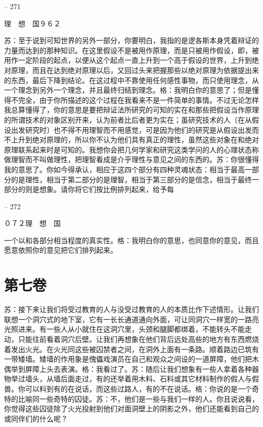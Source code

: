 \documentclass[11pt,oneside]{book}
\begin{document}
\begin{common-format}
    

-- 271

    理　想　国９６２

    苏：至于说到可知世界的另外一部分，你要明白，我指的是逻各斯本身凭着辩证的力量而达到的那种知识。在这里假设不是被用作原理，而是只被用作假设，即，被用作一定阶段的起点，以便从这个起点一直上升到一个高于假设的世界，上升到绝对原理，而且在达到绝对原理以后，又回过头来把握那些以绝对原理为依据提出来的东西，最后下降到结论。在这过程中不靠使用任何感性事物，而只使用理念，从一个理念到另外一个理念，并且最终归结到理念。格：我明白你的意思了；但是懂得不完全，由于你所描述的这个过程在我看来不是一件简单的事情。不过无论怎样我总算懂得了，你的意思是要把辩证法所研究的可知的实在和那些把假设当作原理的所谓技术的对象区别开来，认为前者比后者更为实在；虽研究技术的人〔在从假设出发研究时〕也不得不用理智而不用感觉，可是因为他们的研究是从假设出发而不上升到绝对原理的，所以你不认为他们具有真正的理性，虽然这些对象在和绝对原理联系起来时是可知的。我想你会把几何学家和研究这类学问的人的心理状态称做理智而不叫做理性，把理智看成是介乎理性与意见之间的东西的。苏：你很懂得我的意思了。你如今得承认，相应于这四个部分有四种灵魂状态：相当于最高一部分的是理性，相当于第二部分的是理智，相当于第三部分的是信念，相当于最终一部分的则是想象。请你将它们按比例排列起来，给予每

    

-- 272

    ０７２理　想　国

    一个以和各部分相当程度的真实性。格：我明白你的意思，也同意你的意见，而且愿意依照你的意见把它们排列起来。

    
\chapter{第七卷}
苏：接下来让我们将受过教育的人与没受过教育的人的本质比作下述情形。让我们联想一个洞穴式的地下室，它有一长长通道通向外面，可让同洞穴一样宽的一路亮光照进来。有一些人从小就住在这洞穴里，头颈和腿脚都绑着，不能转头不能走动，只能往前看着洞穴后壁。让我们再想象在他们背后远处高些的地方有东西燃烧着发出火光。在火光同这些被囚禁者之间，在洞外上面有一条路。顺着路边已筑有一带矮墙。矮墙的作用象是傀儡戏演员在自己和观众之间设的一道屏障，他们把木偶举到屏障上头去表演。格：我看过了。苏：随后让我们想象有一些人拿着各种器物举过墙头，从墙后面走过，有的还举着用木料、石料或其它材料制作的假人与假兽。你可以料到有的在说话，而这些过路人，有的不在说话。格：你说的是一个奇特的比喻同一些奇特的囚徒。苏：不，他们是一些与我们一样的人。你且说说看，你觉得这些囚徒除了火光投射到他们对面洞壁上的阴影之外，他们还能看到自己的或同伴们的什么呢？


\end{common-format}
\end{document}
